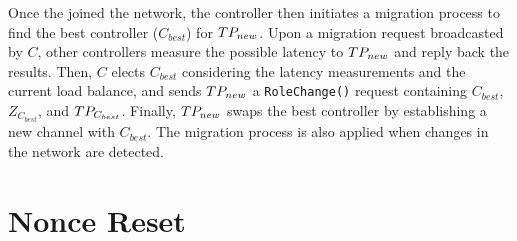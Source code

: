 Once the \tp joined the network, the controller then initiates a migration process to
find the best controller ($C_{best}$) for $TP_{new}$. Upon a migration request broadcasted
by $C$, other controllers measure the possible latency to $TP_{new}$ and reply back
the results. Then, $C$ elects $C_{best}$ considering the latency measurements and the
current load balance, and sends $TP_{new}$ a \texttt{RoleChange()} request containing
$C_{best}$, $Z_{C_{best}}$, and $TP_{C_{best}}$. Finally, $TP_{new}$ swaps the best
controller by establishing a new channel with $C_{best}$. The migration process
is also applied when changes in the network are detected.


\section{Nonce Reset}
\label{sec:nonce}

